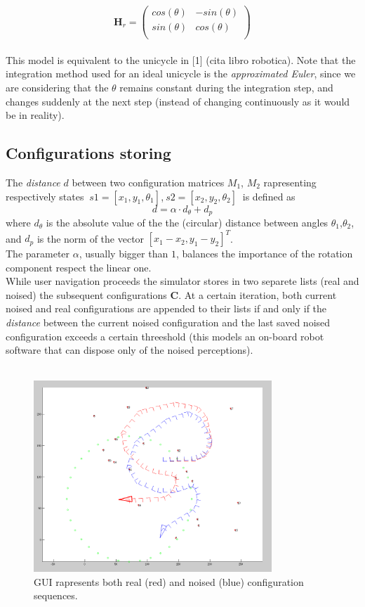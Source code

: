 \[ 
\textbf{H}_r =
\left( \begin{array}{cc}
  cos(\theta)  & -sin(\theta)\\ 
  sin(\theta)  & cos(\theta) \\
\end{array} \right)
\]\\

This model is equivalent to the unicycle in [1] (cita libro robotica).
Note that the integration method used for an ideal unicycle is the \textit{approximated Euler}, since we are considering that the $\theta$ remains constant during the integration step,
and changes suddenly at the next step (instead of changing continuously as it would be in reality).\\
\subsection{Configurations storing}
The \textit{distance} $d$ between two configuration matrices $M_1$, $M_2$ rapresenting respectively states $~ s1 = [x_1,y_1,\theta_1]$,$~ s2 = [x_2,y_2,\theta_2]~$
is defined as
\[ 
d = \alpha \cdot d_{\theta} + d_p
\]
where $d_{\theta}$ is the absolute value of the the (circular) distance between angles $\theta_1$,$\theta_2$,
and $d_p$ is the norm of the vector $[x_1 - x_2,y_1 - y_2]^T$.\\
The parameter $\alpha$, usually bigger than $1$, balances the importance of the rotation component respect the linear one.\\
While user navigation proceeds the simulator stores in two separete lists (real and noised) the subsequent configurations $\textbf{C}$.
At a certain iteration, both current noised and real configurations are appended to their lists if and only if the \textit{distance} between the current noised configuration 
and the last saved noised configuration exceeds a certain threeshold (this models an on-board robot software that can dispose only of the noised perceptions).\\
\\
\begin{figure}[htbp]
  \centering
    \includegraphics[width=0.8\textwidth]{images/matlab_simulator.png}
  \caption{GUI rapresents both real (red) and noised (blue) configuration sequences.}
  \label{fig:matlab_simulator}
\end{figure}

